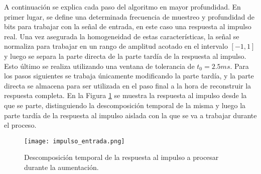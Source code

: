 A continuación se explica cada paso del algoritmo en mayor profundidad.
En primer lugar, se define una determinada frecuencia de muestreo y profundidad de bits para trabajar con la señal de entrada, en este caso una respuesta al impulso real. Una vez asegurada la homogeneidad de estas características, la señal se normaliza para trabajar en un rango de amplitud acotado en el intervalo $[-1,1]$ y luego se separa la parte directa de la parte tardía de la respuesta al impulso. Esto último se realiza utilizando una ventana de tolerancia de $t_{0} = 2.5 ms$. Para los pasos siguientes se trabaja únicamente modificando la parte tardía, y la parte directa se almacena para ser utilizada en el paso final a la hora de reconstruir la respuesta completa. En la Figura \ref{fig:impulso_entrada} se  muestra la respuesta al impulso desde la que se parte, distinguiendo la descomposición temporal de la misma y luego la parte tardía de la respuesta al impulso aislada con la que se va a trabajar durante el proceso.

\begin{figure}[H]
	\centering{}
	\texttt{[image: impulso\_entrada.png]}
	\caption{Descomposición temporal de la respuesta al impulso a procesar durante la aumentación.}
	\label{fig:impulso_entrada}
\end{figure}

